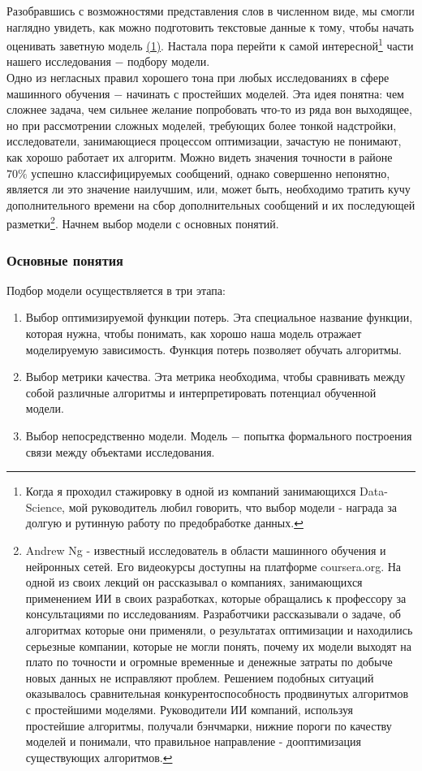 \documentclass{article}
\begin{document}
Разобравшись с возможностями представления слов в численном виде, мы смогли наглядно увидеть, как можно подготовить текстовые данные к тому, чтобы начать оценивать заветную модель \hyperref[eq:F]{(1)}. Настала пора перейти к самой интересной\footnote{Когда я проходил стажировку в одной из компаний занимающихся Data-Science, мой руководитель любил говорить, что выбор модели - награда за долгую и рутинную работу по предобработке данных.} части нашего исследования $-$ подбору модели. \\
Одно из негласных правил хорошего тона при любых исследованиях в сфере машинного обучения $-$ начинать с простейших моделей. Эта идея понятна: чем сложнее задача, чем сильнее желание попробовать что-то из ряда вон выходящее, но при рассмотрении сложных моделей, требующих более тонкой надстройки, исследователи, занимающиеся процессом оптимизации, зачастую не понимают, как хорошо работает их алгоритм. Можно видеть значения точности в районе $70\%$ успешно классифицируемых сообщений, однако совершенно непонятно, является ли это значение наилучшим, или, может быть, необходимо тратить кучу дополнительного времени на сбор дополнительных сообщений и их последующей разметки\footnote{Andrew Ng - известный исследователь в области машинного обучения и нейронных сетей. Его видеокурсы доступны на платформе coursera.org. На одной из своих лекций он рассказывал о компаниях, занимающихся применением ИИ в своих разработках, которые обращались к профессору за консультациями по исследованиям. Разработчики рассказывали о задаче, об алгоритмах которые они применяли, о результатах оптимизации и находились серьезные компании, которые не могли понять, почему их модели выходят на плато по точности и огромные временные и денежные затраты по добыче новых данных не исправляют проблем. Решением подобных ситуаций оказывалось сравнительная конкурентоспособность продвинутых алгоритмов с простейшими моделями. Руководители ИИ компаний, используя простейшие алгоритмы, получали бэнчмарки, нижние пороги по качеству моделей и понимали, что правильное направление - дооптимизация существующих алгоритмов.}. Начнем выбор модели с основных понятий. \\
\subsubsection{Основные понятия}
Подбор модели осуществляется в три этапа:
\begin{enumerate}
	\item Выбор оптимизируемой функции потерь. Эта специальное название функции, которая нужна, чтобы понимать, как хорошо наша модель отражает моделируемую зависимость. Функция потерь позволяет обучать алгоритмы.
	\item Выбор метрики качества. Эта метрика необходима, чтобы сравнивать между собой различные алгоритмы и интерпретировать потенциал обученной модели.
	\item Выбор непосредственно модели. Модель $-$ попытка формального построения связи между объектами исследования.
\end{enumerate}
\end{document}
